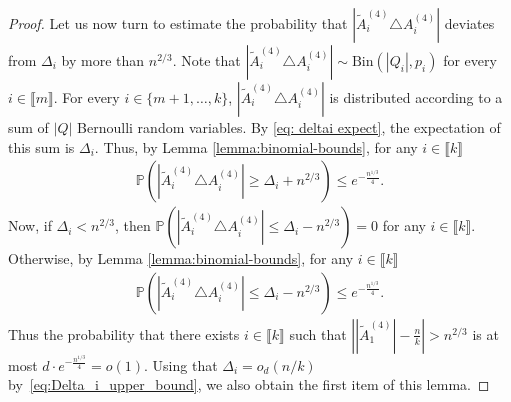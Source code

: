 \documentclass[notitlepage]{scrartcl}
\newcommand{\br}[1]{\llbracket{#1}\rrbracket}
\begin{document}
\begin{proof}
Let us now turn to estimate the probability that $\left|\tilde{A}_i^{(4)}\triangle A_i^{(4)}\right|$ deviates from $\Delta_i$ by more than $n^{2/3}$. Note that $\left|\tilde{A}_i^{(4)}\triangle A_i^{(4)}\right|\sim \text{Bin}(|Q_i|,p_i)$ for every $i\in \br{m}$. For every $i\in \{m+1,\ldots,k\}$, $\left|\tilde{A}_i^{(4)}\triangle A_i^{(4)}\right|$ is distributed according to a sum of $|Q|$ Bernoulli random variables. By \eqref{eq: deltai expect}, the expectation of this sum is $\Delta_i$. Thus, by Lemma \ref{lemma:binomial-bounds}, for any $i\in \br{k}$
\begin{align*}
    \mathbb{P}\left(\left|\tilde{A}_i^{(4)}\triangle A_i^{(4)}\right|\ge \Delta_i+n^{2/3}\right)\le e^{-\frac{n^{1/3}}{4}}.
\end{align*}
Now, if $\Delta_i<n^{2/3}$, then $\mathbb{P}\left(\left|\tilde{A}_i^{(4)}\triangle A_i^{(4)}\right|\le \Delta_i-n^{2/3}\right)=0$ for any $i\in \br{k}$. Otherwise, by Lemma \ref{lemma:binomial-bounds}, for any $i\in \br{k}$
\begin{align*}
\mathbb{P}\left(\left|\tilde A_i^{(4)}\triangle A_i^{(4)}\right|\le \Delta_i-n^{2/3}\right)\le e^{-\frac{n^{1/3}}{4}}.
\end{align*}
Thus the probability that there exists $i\in \br{k}$ such that $\left||\tilde A_1^{(4)}|-\frac{n}{k}\right|>n^{2/3}$ is at most $d\cdot e^{-\frac{n^{1/3}}{4}}=o(1)$. Using that $\Delta_i=o_d(n/k)$ by~\eqref{eq:Delta_i_upper_bound}, we also obtain the first item of this lemma.
\end{proof}
\end{document}
